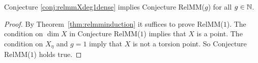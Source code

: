 \documentclass[12pt,oneside]{amsart}
\begin{document}
\begin{corollary}
  \label{cor:relmmconditional}
  Conjecture \ref{conj:relmmXdeg1dense}
  implies  Conjecture RelMM($g$)  for all $g\in{\mathbb{N}}$.
\end{corollary}
\begin{proof}
  By Theorem~\ref{thm:relmminduction} it suffices to prove RelMM($1$).
  The condition on $\dim X$ in Conjecture RelMM($1$)
  implies that $X$ is a point. The condition on $X_\eta$ and $g=1$ imply that $X$
  is not a torsion point. So Conjecture RelMM($1$) holds true.   
\end{proof}






\end{document}
